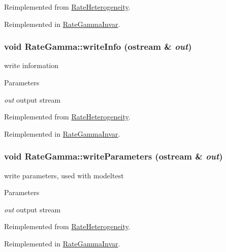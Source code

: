 Reimplemented from \hyperlink{classRateHeterogeneity_a1305d5b8481dd5a2482917ddb5fe57bd}{RateHeterogeneity}.

Reimplemented in \hyperlink{classRateGammaInvar_ab72a2559cea978d312a243d521c2abef}{RateGammaInvar}.\hypertarget{classRateGamma_a835bb210fd8fb4552613fe49875cbfb5}{
\subsubsection[{writeInfo}]{\setlength{\rightskip}{0pt plus 5cm}void RateGamma::writeInfo (ostream \& {\em out})}}
\label{classRateGamma_a835bb210fd8fb4552613fe49875cbfb5}
write information 
\begin{DoxyParams}{Parameters}
\item[{\em out}]output stream \end{DoxyParams}


Reimplemented from \hyperlink{classRateHeterogeneity_a520772859d465036b6620bdbf2977efe}{RateHeterogeneity}.

Reimplemented in \hyperlink{classRateGammaInvar_a428c3ac79ba1bf28da546f602d4b0f7b}{RateGammaInvar}.\hypertarget{classRateGamma_a88ffb33131f2cf23cfd0525e092c7717}{
\subsubsection[{writeParameters}]{\setlength{\rightskip}{0pt plus 5cm}void RateGamma::writeParameters (ostream \& {\em out})}}
\label{classRateGamma_a88ffb33131f2cf23cfd0525e092c7717}
write parameters, used with modeltest 
\begin{DoxyParams}{Parameters}
\item[{\em out}]output stream \end{DoxyParams}


Reimplemented from \hyperlink{classRateHeterogeneity_ad2832e686971cf1f2cac2a6f842a3550}{RateHeterogeneity}.

Reimplemented in \hyperlink{classRateGammaInvar_a13b6629de9e3579aacff555f1bd76db5}{RateGammaInvar}.

